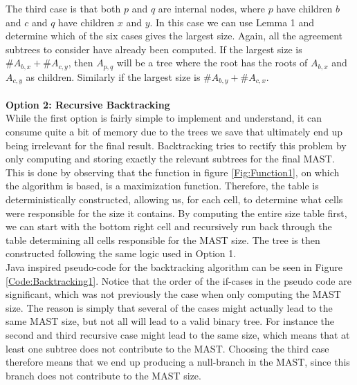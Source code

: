 The third case is that both $p$ and $q$ are internal nodes, where $p$ have children $b$ and $c$ and $q$ have children $x$ and $y$. In this case we can use Lemma 1 and determine which of the six cases gives the largest size. Again, all the agreement subtrees to consider have already been computed. If the largest size is $\#A_{b,x} + \#A_{c,y}$, then $A_{p,q}$ will be a tree where the root has the roots of $A_{b,x}$ and $A_{c,y}$ as children. Similarly if the largest size is $\#A_{b,y} + \#A_{c,x}$.\\
\\
\textbf{Option 2: Recursive Backtracking} \\
While the first option is fairly simple to implement and understand, it can consume quite a bit of memory due to the trees we save that ultimately end up being irrelevant for the final result. Backtracking tries to rectify this problem by only computing and storing exactly the relevant subtrees for the final MAST. This is done by observing that the function in figure \ref{Fig:Function1}, on which the algorithm is based, is a maximization function. Therefore, the table is deterministically constructed, allowing us, for each cell, to determine what cells were responsible for the size it contains. By computing the entire size table first, we can start with the bottom right cell and recursively run back through the table determining all cells responsible for the MAST size. The tree is then constructed following the same logic used in Option 1. 
\\
Java inspired pseudo-code for the backtracking algorithm can be seen in Figure \ref{Code:Backtracking1}. Notice that the order of the if-cases in the pseudo code are significant, which was not previously the case when only computing the MAST size. The reason is simply that several of the cases might actually lead to the same MAST size, but not all will lead to a valid binary tree. For instance the second and third recursive case might lead to the same size, which means that at least one subtree does not contribute to the MAST. Choosing the third case therefore means that we end up producing a null-branch in the MAST, since this branch does not contribute to the MAST size. 
    
